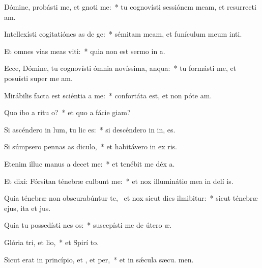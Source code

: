 \item Dómine, probásti me, et gnoti me:~* tu cognovísti sessiónem meam, et resurrecti am.
\item Intellexísti cogitatiónes as de ge:~* sémitam meam, et funículum meum inti.
\item Et omnes vias meas viti:~* quia non est sermo in  a.
\item Ecce, Dómine, tu cognovísti ómnia novíssima,  anqua:~* tu formásti me, et posuísti super me  am.
\item Mirábilis facta est sciéntia a  me:~* confortáta est, et non póte  am.
\item Quo ibo a ritu o?~* et quo a fácie  giam?
\item Si ascéndero in lum, tu lic es:~* si descéndero in in, es.
\item Si súmpsero pennas as diculo,~* et habitávero in ex ris.
\item Etenim illuc manus a decet me:~* et tenébit me déx a.
\item Et dixi: Fórsitan ténebræ culbunt me:~* et nox illuminátio mea in delí is.
\item Quia ténebræ non obscurabúntur  te,~\pscross{} et nox sicut dies ilmibitur:~* sicut ténebræ ejus, ita et  jus.
\item Quia tu possedísti nes os:~* suscepísti me de útero  æ.
\item Glória tri, et lio,~* et Spirí to.
\item Sicut erat in princípio, et , et per,~* et in sǽcula sæcu. men.
